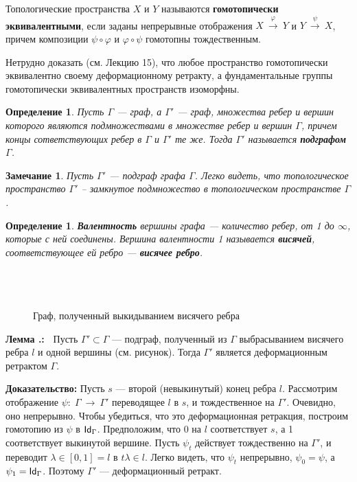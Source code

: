 \documentclass[12pt]{book}
\newcommand{\arrow}{{\:\longrightarrow\:}}
\def\endproof{\hbox{\vrule width 5pt height 5pt depth 0pt}}
\renewcommand{\phi}{\varphi}
\def\Id{{\operatorname{\sf Id}}}
\theoremstyle{upshape}
\newtheorem{zadacha}{Задача}[chapter]
\theoremstyle{generic}
\newtheorem{opredelenie}[teorema]{Определение}
\newtheorem{remark}[teorema]{Замечание}
\def\замечание{\begin{remark}}
\def\еза{\end{remark}}
\theoremstyle{upshapenonumber}
\newcommand{\следствие}{%
     \refstepcounter{teorema}
     {\noindent\bf Следствие \thechapter.\arabic{teorema}:\ }}
\newcommand{\пример}{%
     \refstepcounter{teorema}
     {\noindent\bf Пример \thechapter.\arabic{teorema}:\ }}
\newcommand{\лемма}{%
     \refstepcounter{teorema}
     {\noindent\bf Лемма \thechapter.\arabic{teorema}:\ }}
\newcommand{\теорема}{%
     \refstepcounter{teorema}
     {\noindent\bf Теорема \thechapter.\arabic{teorema}:\ }}
\newcommand{\утверждение}{%
     \refstepcounter{teorema}
     {\noindent\bf Утверждение \thechapter.\arabic{teorema}:\ }}
\def\хфилл{\hfill}
\def\ноиндент{\noindent}
\def\бф{\bf}
\def\ем{\em}
\def\задача{\begin{zadacha}}
\def\ез{\end{zadacha}}
\def\еу{\end{ukazanie}}
\def\определение{\begin{opredelenie}}
\def\ео{\end{opredelenie}}
\def\енум{\begin{enumerate}}
\def\ее{\end{enumerate}}
\begin{document}
Топологические пространства $X$ и $Y$ называются
{\бф гомотопически эквивалентными},
если заданы непрерывные отображения $X \stackrel \phi \arrow Y$
и $Y \stackrel \psi\arrow X$, причем композиции
$\psi\circ \phi$ и $\phi \circ \psi$ гомотопны
тождественным.

Нетрудно доказать (см. Лекцию 15), что любое пространство
гомотопически эквивалентно своему деформационному
ретракту, а фундаментальные группы гомотопически
эквивалентных пространств изоморфны.

\определение
Пусть $\Gamma$ --- граф, а
 $\Gamma'$ --- граф, множества ребер и вершин которого
являются подмножествами в множестве
ребер и вершин $\Gamma$, причем концы
сответствующих ребер в $\Gamma$ и $\Gamma'$ те же.
  Тогда $\Gamma'$
называется {\bf  подграфом} $\Gamma$.
\ео

\замечание 
Пусть $\Gamma'$ --- подграф графа $\Gamma$.
Легко видеть, что топологическое пространство $\Gamma'$ --
замкнутое подмножество в топологическом пространстве
$\Gamma$.
\еза

\определение
{\бф Валентность} вершины графа --- количество ребер, 
от 1 до $\infty$, которые с ней соединены. Вершина валентности 1
называется {\бф висячей}, соответствующее ей ребро ---
{\бф висячее ребро}.
\ео


\begin{figure}[ht]
\begin{center}\ \\
\\ \  \\
{\small Граф, полученный выкидыванием висячего ребра}
\end{center}
\end{figure}

\лемма
Пусть $\Gamma'\subset \Gamma$ --- подграф, полученный
из $\Gamma$ выбрасыванием висячего ребра $l$ и одной вершины
(см. рисунок). Тогда $\Gamma'$ является
деформационным ретрактом $\Gamma$.

\хфилл

\ноиндент
{\бф Доказательство:}
Пусть $s$ --- второй (невыкинутый) конец ребра $l$.
Рассмотрим отображение $\psi:\; \Gamma\arrow \Gamma'$
переводящее $l$ в $s$,
и тождественное на $\Gamma'$. Очевидно, оно
непрерывно. Чтобы убедиться, что это деформационная ретракция,
построим гомотопию из $\psi$ в $\Id_\Gamma$. Предположим,
что $0$ на $l$ соответствует $s$, а 1 соответствует выкинутой вершине.
Пусть $\psi_t$ действует тождественно на $\Gamma'$,
и переводит $\lambda\in [0,1]=l$ в $t\lambda \in l$.
Легко видеть, что $\psi_t$ непрерывно,
$\psi_0=\psi$, а $\psi_1=\Id_\Gamma$.
Поэтому $\Gamma'$ --- деформационный ретракт.
\endproof
\end{document}
